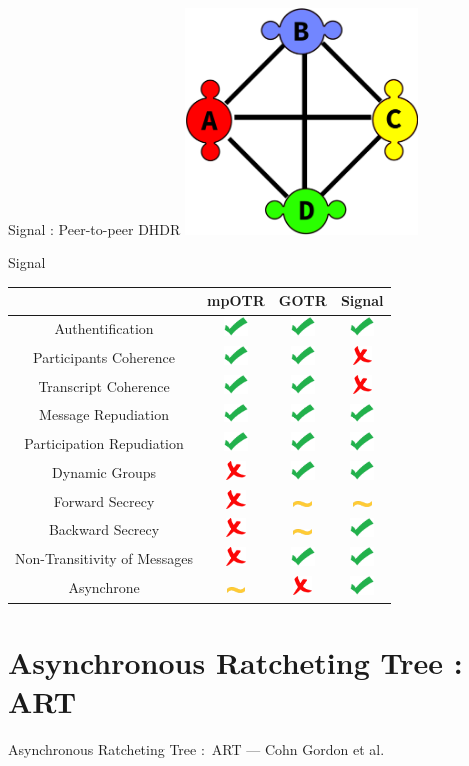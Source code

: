 \documentclass{beamer}
\newcommand{\okay}{\includegraphics[height=0.5cm]{img/check.png}}
\newcommand{\nope}{\includegraphics[height=0.5cm]{img/cross.png}}
\newcommand{\sortof}{\includegraphics[width=0.5cm]{img/tilde.png}}
\begin{document}
\begin{frame}{Signal : Peer-to-peer DHDR}
	\center
	\includegraphics[height=6cm]{img/group_p2p.png}
\end{frame}

\begin{frame}{Signal}
	\center
  	\begin{tabular}{c|ccc}
			                              & mpOTR   & GOTR    & Signal\\
			\hline
  		Authentification              & \okay   & \okay   & \okay \\
  		\hline
  		Participants Coherence        & \okay   & \okay   & \nope\\
  		Transcript Coherence          & \okay   & \okay   & \nope \\
  		\hline
  		Message Repudiation           & \okay   & \okay   & \okay \\
  		Participation Repudiation     & \okay   & \okay   & \okay \\
  		\hline
  		Dynamic Groups                & \nope   & \okay   & \okay \\
  		\hline
  		Forward Secrecy               & \nope   & \sortof & \sortof \\
  		Backward Secrecy              & \nope   & \sortof & \okay \\
  		Non-Transitivity of Messages  & \nope   & \okay   & \okay \\
  		\hline
  		Asynchrone                    & \sortof & \nope   & \okay
    \end{tabular}
\end{frame}

\section{Asynchronous Ratcheting Tree : ART}

\begin{frame}{Asynchronous Ratcheting Tree : ART — Cohn Gordon et al.~\cite{art}}
	\center
\end{frame}
\end{document}
